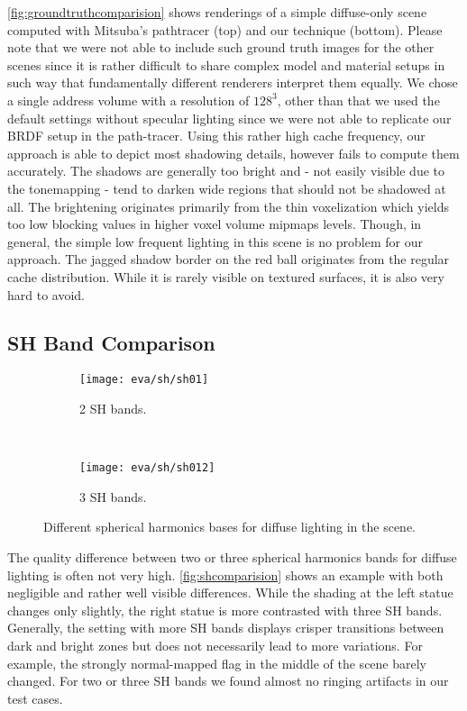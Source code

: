 \documentclass[thesis.tex]{subfiles}
\begin{document}
\autoref{fig:groundtruthcomparision} shows renderings of a simple diffuse-only scene computed with Mitsuba's pathtracer \cite{bib:mitsuba} (top) and our technique (bottom).
Please note that we were not able to include such ground truth images for the other scenes since it is rather difficult to share complex model and material setups in such way that fundamentally different renderers interpret them equally.
We chose a single address volume with a resolution of $128^3$, other than that we used the default settings without specular lighting since we were not able to replicate our BRDF setup in the path-tracer.
Using this rather high cache frequency, our approach is able to depict most shadowing details, however fails to compute them accurately.
The shadows are generally too bright and - not easily visible due to the tonemapping - tend to darken wide regions that should not be shadowed at all.
The brightening originates primarily from the thin voxelization which yields too low blocking values in higher voxel volume mipmaps levels.
Though, in general, the simple low frequent lighting in this scene is no problem for our approach.
The jagged shadow border on the red ball originates from the regular cache distribution.
While it is rarely visible on textured surfaces, it is also very hard to avoid.

\subsection{SH Band Comparison} \label{sec:eva:shquality}
\begin{figure}[h]
\centering
\begin{subfigure}[b]{0.9\textwidth}
\texttt{[image: eva/sh/sh01]}
\caption{2 SH bands.}
\end{subfigure}
\\
\begin{subfigure}[b]{0.9\textwidth}
\texttt{[image: eva/sh/sh012]}
\caption{3 SH bands.}
\end{subfigure}
\caption{Different spherical harmonics bases for diffuse lighting in the  scene.}
\label{fig:shcomparision}
\end{figure}
The quality difference between two or three spherical harmonics bands for diffuse lighting is often not very high.
\autoref{fig:shcomparision} shows an example with both negligible and rather well visible differences.
While the shading at the left statue changes only slightly, the right statue is more contrasted with three SH bands.
Generally, the setting with more SH bands displays crisper transitions between dark and bright zones but does not necessarily lead to more variations.
For example, the strongly normal-mapped flag in the middle of the scene barely changed.
For two or three SH bands we found almost no ringing artifacts in our test cases.
\end{document}
